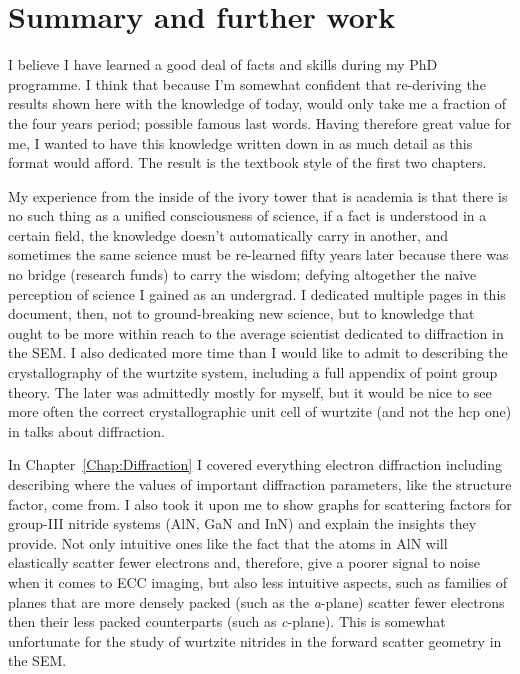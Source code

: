 \chapter{Summary and further work}
\label{chap:Conclusion}


I believe I have learned a good deal of facts and skills during my PhD programme. I think that because I'm somewhat confident that re-deriving the results shown here with the knowledge of today, would only take me a fraction of the four years period; possible famous last words. Having therefore great value for me, I wanted to have this knowledge written down in as much detail as this format would afford. The result is the textbook style of the first two chapters. 

My experience from the inside of the ivory tower that is academia is that there is no such thing as a unified consciousness of science, if a fact is understood in a certain field, the knowledge doesn't automatically carry in another, and sometimes the same science must be re-learned fifty years later because there was no bridge (research funds) to carry the wisdom; defying altogether the naive perception of science I gained as an undergrad. I dedicated multiple pages in this document, then, not to ground-breaking new science, but to knowledge that ought to be more within reach to the average scientist dedicated to diffraction in the SEM. I also dedicated more time than I would like to admit to describing the crystallography of the wurtzite system, including a full appendix of point group theory. The later was admittedly mostly for myself, but it would be nice to see more often the correct crystallographic unit cell of wurtzite (and not the hcp one) in talks about diffraction. 

In Chapter~\ref{Chap:Diffraction} I covered  everything electron diffraction including describing where the values of important diffraction parameters, like the structure factor, come from.  I also took it upon me to show graphs for scattering factors for group-III nitride systems (AlN, GaN and InN) and explain the insights they provide. Not only intuitive ones like the fact that the atoms in AlN will elastically scatter fewer electrons and, therefore, give a poorer signal to noise when it comes to ECC imaging, but also less intuitive aspects, such as families of planes that are more densely packed (such as the \textit{a}-plane) scatter fewer electrons then their less packed counterparts (such as \textit{c}-plane). This is somewhat unfortunate for the study of \hkl[001] wurtzite nitrides in the forward scatter geometry in the SEM. 

